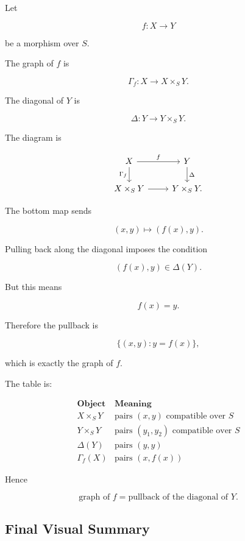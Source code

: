 \documentclass[12pt,a4paper]{article}
\theoremstyle{notespace}
\begin{document}
Let

\[
f:X\to Y
\]

be a morphism over \(S\).

The graph of \(f\) is

\[
\Gamma_f:X\to X\times_S Y.
\]

The diagonal of \(Y\) is

\[
\Delta:Y\to Y\times_S Y.
\]

The diagram is

\[
\begin{tikzcd}
	X \arrow[r,"f"] \arrow[d,"\Gamma_f"']
	&
	Y \arrow[d,"\Delta"]
	\\
	X\times_S Y \arrow[r]
	&
	Y\times_S Y.
\end{tikzcd}
\]

The bottom map sends

\[
(x,y)\mapsto (f(x),y).
\]

Pulling back along the diagonal imposes the condition

\[
(f(x),y)\in \Delta(Y).
\]

But this means

\[
f(x)=y.
\]

Therefore the pullback is

\[
\{(x,y):y=f(x)\},
\]

which is exactly the graph of \(f\).

The table is:

\[
\begin{array}{c|c}
	\textbf{Object} & \textbf{Meaning} \\
	\hline
	X\times_S Y
	&
	\text{pairs }(x,y)\text{ compatible over }S
	\\
	\hline
	Y\times_S Y
	&
	\text{pairs }(y_1,y_2)\text{ compatible over }S
	\\
	\hline
	\Delta(Y)
	&
	\text{pairs }(y,y)
	\\
	\hline
	\Gamma_f(X)
	&
	\text{pairs }(x,f(x))
\end{array}
\]

Hence

\[
\boxed{
	\text{graph of }f=\text{pullback of the diagonal of }Y.
}
\]

\subsection{Final Visual Summary}
\end{document}
